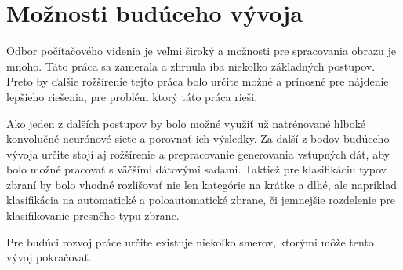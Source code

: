 
\section{Možnosti budúceho vývoja}

Odbor počítačového videnia je veľmi široký a možnosti pre spracovania obrazu je mnoho.
Táto práca sa zamerala a zhrnula iba niekoľko základných postupov.
Preto by ďalšie rožšírenie tejto práca bolo určite možné a prínosné pre nájdenie lepšieho riešenia, pre problém ktorý táto práca rieši.

Ako jeden z dalších postupov by bolo možné využiť už natrénované hlboké konvolučné neurónové siete a porovnať ich výsledky.
Za další z bodov budúceho vývoja určite stojí aj rožšírenie a prepracovanie generovania vstupných dát, aby bolo
    možné pracovať s väčšími dátovými sadami.
Taktiež pre klasifikáciu typov zbraní by bolo vhodné rozlišovať nie len kategórie na krátke a dlhé, ale napríklad klasifikácia
    na automatické a poloautomatické zbrane, či jemnejšie rozdelenie pre klasifikovanie presného typu zbrane.

Pre budúci rozvoj práce určite existuje niekoľko smerov, ktorými môže tento vývoj pokračovať.
